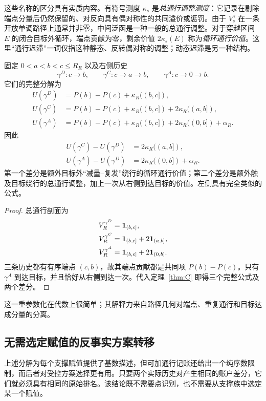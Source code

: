 这些名称的区分具有实质内容。有符号测度 $\kappa_s$ 是\emph{总通行调整测度}：它记录在剔除端点分量后仍然保留的、对反向具有偶对称性的共同溢价或惩罚。由于 $V_s^\gamma$ 在一条开放单调路径上通常并非零，中间泛函是一种一般的总通行调整。对于穿越区间 $E$ 的闭合目标外循环，端点贡献为零，剩余价值 $2\kappa_s(E)$ 称为\emph{循环通行价值}。这里“通行迟滞”一词仅指这种静态、反转偶对称的调整；动态迟滞是另一种结构。

\begin{corollary}[直接、绕行与触及目标历史]\label{cor:three-history}
固定 $0<a<b<c\le R_R$ 以及右侧历史
\[
 \gamma^D:c\to b,
 \qquad
 \gamma^C:c\to a\to b,
 \qquad
 \gamma^A:c\to0\to b.
\]
它们的完整分解为
\[
\begin{aligned}
 U(\gamma^D)
  &=P(b)-P(c)+\kappa_R((b,c]),\\
 U(\gamma^C)
  &=P(b)-P(c)+\kappa_R((b,c])+2\kappa_R((a,b]),\\
 U(\gamma^A)
  &=P(b)-P(c)+\kappa_R((b,c])+2\kappa_R((0,b])+\alpha_R.
\end{aligned}
\]
因此
\[
\begin{aligned}
 U(\gamma^C)-U(\gamma^D)
  &=2\kappa_R((a,b]),\\
 U(\gamma^A)-U(\gamma^D)
  &=2\kappa_R((0,b])+\alpha_R.
\end{aligned}
\]
第一个差分是额外目标外“减量--复发”绕行的循环通行价值；第二个差分是额外触及目标绕行的总通行调整，加上一次从右侧到达目标的价值。左侧具有完全类似的公式。
\end{corollary}

\begin{proof}
总通行剖面为
\[
\begin{aligned}
 V_R^{\gamma^D}&=\mathbf 1_{(b,c]},\\
 V_R^{\gamma^C}&=\mathbf 1_{(b,c]}+2\mathbf 1_{(a,b]},\\
 V_R^{\gamma^A}&=\mathbf 1_{(b,c]}+2\mathbf 1_{(0,b]}.
\end{aligned}
\]
三条历史都有有序端点 $(c,b)$，故其端点贡献都是共同项 $P(b)-P(c)$。只有 $\gamma^A$ 到达目标，并且恰好从右侧到达一次。代入定理~\ref{thm:C} 即得三个完整公式及两个差分。
\end{proof}

这一重参数化在代数上很简单；其解释力来自路径几何对端点、重复通行和目标达成分量的分离。

\subsection{无需选定赋值的反事实方案转移}

上述分解为每个支撑赋值提供了基数描述，但可加通行记账还给出一个纯序数限制，而后者对受控方案选择更有用。只要两个实际历史对产生相同的账户差分，它们就必须具有相同的原始排名。该结论既不需要点识别，也不需要从支撑族中选定某一个赋值。


